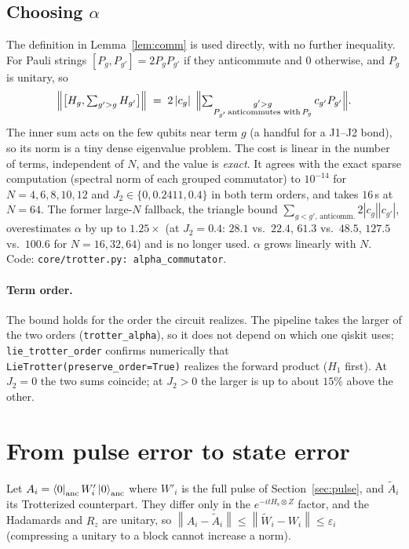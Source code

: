 \documentclass[11pt]{article}
\theoremstyle{definition}
\newcommand{\norm}[1]{\left\lVert #1\right\rVert}
\newcommand{\abs}[1]{\left\lvert #1\right\rvert}
\newcommand{\ket}[1]{\left\lvert #1\right\rangle}
\newcommand{\bra}[1]{\left\langle #1\right\rvert}
\newcommand{\Hs}{H_{\mathrm s}}
\newcommand{\eps}{\varepsilon}
\newcommand{\code}[1]{\texttt{#1}}
\begin{document}
\subsection{Choosing $\alpha$}\label{sec:alpha}
The definition in Lemma~\ref{lem:comm} is used directly, with no further inequality. For Pauli strings
$[P_g,P_{g'}]=2P_gP_{g'}$ if they anticommute and $0$ otherwise, and $P_g$ is unitary, so
\begin{equation}\label{eq:alpha}
  \Bigl\lVert\bigl[H_g,\textstyle\sum_{g'>g}H_{g'}\bigr]\Bigr\rVert
  \;=\;2\abs{c_g}\;\Bigl\lVert\sum_{\substack{g'>g\\ P_{g'}\,\text{anticommutes with}\,P_g}}c_{g'}P_{g'}\Bigr\rVert .
\end{equation}
The inner sum acts on the few qubits near term $g$ (a handful for a J1--J2 bond), so its norm is a tiny dense eigenvalue
problem. The cost is linear in the number of terms, independent of $N$, and the value is \emph{exact}. It agrees with the
exact sparse computation (spectral norm of each grouped commutator) to $10^{-14}$ for $N=4,6,8,10,12$ and $J_2\in\{0,0.2411,0.4\}$ in both term orders, and takes $16$\,s at
$N=64$. The former large-$N$ fallback, the triangle bound $\sum_{g<g',\,\text{anticomm.}}2\abs{c_g}\abs{c_{g'}}$,
overestimates $\alpha$ by up to $1.25\times$ (at $J_2=0.4$: $28.1$ vs.\ $22.4$, $61.3$ vs.\ $48.5$, $127.5$ vs.\ $100.6$ for
$N=16,32,64$) and is no longer used. $\alpha$ grows linearly with $N$. Code: \code{core/trotter.py: alpha\_commutator}.

\paragraph{Term order.} The bound holds for the order the circuit realizes. The pipeline takes the larger of the two orders (\code{trotter\_alpha}), so it
does not depend on which one qiskit uses; \code{lie\_trotter\_order} confirms numerically that \code{LieTrotter(preserve\_order=True)} realizes the forward
product ($H_1$ first). At $J_2=0$ the two sums coincide; at $J_2>0$ the larger is up to about $15\%$ above the other.

\section{From pulse error to state error}\label{sec:state}
Let $A_i=\bra0_{\rm anc}W'_i\ket0_{\rm anc}$ where $W'_i$ is the full pulse of Section~\ref{sec:pulse}, and $\tilde A_i$ its
Trotterized counterpart. They differ only in the $e^{-it\Hs\otimes Z}$ factor, and the Hadamards and $R_z$ are unitary, so
$\norm{A_i-\tilde A_i}\le\norm{\tilde W_i-W_i}\le\eps_i$ (compressing a unitary to a block cannot increase a norm).
\end{document}
